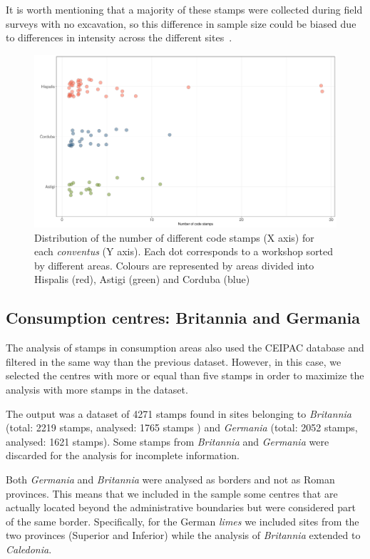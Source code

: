 \documentclass[review]{elsarticle}
\newcommand{\memo}[2]{\textcolor{#1}{#2}}
\newcommand{\xavi}[1]{\memo{magenta}{XRC: #1\\}}
\begin{document}
It is worth mentioning that a majority of these stamps were collected during field surveys with no excavation, so this difference in sample size could be biased due to differences in intensity across the different sites~\citep{arva_1997}.
 
\begin{figure}[htp]
	\centering
\includegraphics[width=\linewidth]{figs/frequency}
\caption{Distribution of the number of different code stamps (X axis) for each \textit{conventus} (Y axis). Each dot corresponds to a workshop sorted by different areas. Colours are represented by areas divided into Hispalis (red), Astigi (green) and Corduba (blue)}
\label{frequency}
\end{figure} 



\subsection{Consumption centres: Britannia and Germania}


The analysis of stamps in consumption areas also used the CEIPAC database and filtered in the same way than the previous dataset. However, in this case, we selected the centres with more or equal than five stamps in order to maximize the analysis with more stamps in the dataset.   


The output was a dataset of 4271 stamps found in sites belonging to \textit{Britannia} (total: 2219 stamps, analysed: 1765 stamps ) and \textit{Germania} (total: 2052 stamps, analysed: 1621 stamps). Some stamps from \textit{Britannia} and \textit{Germania} were discarded for the analysis for incomplete information.  

Both \textit{Germania} and \textit{Britannia} were analysed as borders and not as Roman provinces. This means that we included in the sample some centres that are actually located beyond the administrative boundaries but were considered part of the same border. Specifically, for the German \textit{limes} we included sites from the two provinces (Superior and Inferior) while the analysis of \textit{Britannia} extended to \textit{Caledonia}.
 
\end{document}

